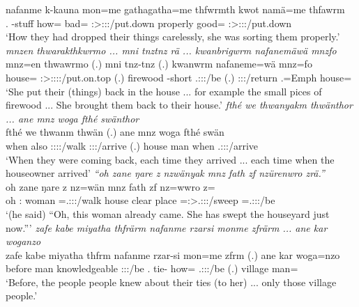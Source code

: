 \begin{exe}
	\gll nafanme k-kauna mon=me gathagatha=me thfwrmth kwot namä=me thfawrm\\
	\Tnsg.{\Poss} \Redup-stuff how={\Ins} bad={\Ins} \Stpl:\Sbj>\Stpl:\Io:\Pst:\Dur/put.down properly good={\Ins} \Stsg:\Sbj>\Stpl:\Obj:\Pst:\Dur/put.down\\
	\trans `How they had dropped their things carelessly, she was sorting them properly.'
	\emph{mnzen thwarakthkwrmo ... mni tnztnz rä ... kwanbrigwrm nafanemäwä mnzfo}\\
	\gll mnz=en thwawrmo (.) mni tnz-tnz  (.) kwanwrm nafaneme=wä mnz=fo\\
	house={\Loc} \Sg:\Sbj>\Stpl:\Io:\Pst:\Dur:\Andat/put.on.top (.) firewood \Redup-short \Tsg.\F:\Sbj:\Nonpast:\Ipfv/be (.) \Stsg:\Sbj:\Pst:\Dur/return \Tnsg.\Poss=Emph{} house=\All\\
	\trans `She put their (things) back in the house ... for example the small pices of firewood ... She brought them back to their house.'
	\emph{fthé we thwanyakm thwänthor ... ane mnz woga fthé swänthor}\\
	\gll fthé we thwanm thwän (.) ane mnz woga fthé swän\\
	when also \Stpl:\Sbj:\Pst:\Dur:\Venit/walk \Stpl:\Sbj:\Iter:\Venit/arrive (.) {\Dem} house man when \Tsg.\Masc:\Sbj:\Iter:\Venit/arrive\\
	\trans `When they were coming back, each time they arrived ... each time when the houseowner arrived'
	\emph{``oh zane ŋare z nzwänyak mnz fath zf nzürenwro zrä.''}\\
	\gll oh zane ŋare z nz=wän mnz fath zf nz=wwro z=\\
	oh \Dem:{\Prox} woman {\Iam} \Immpst=\Tsg.\F:\Nonpast:\Ipfv:\Venit/walk house {clear place} {\Imm} \Immpst=\Sg:\Sbj>\Tsg.\F:\Nonpast:\Ipfv:\Andat/sweep \Prox=\Tsg.\F:\Sbj:\Nonpast:\Ipfv/be\\
	\trans `(he said) ``Oh, this woman already came. She has swept the houseyard just now.'''
	\emph{zafe kabe miyatha thfrärm nafanme rzarsi monme zfrärm ... ane kar woganzo}\\
	\gll zafe kabe miyatha thfrm nafanme rzar-si mon=me zfrm (.) ane kar woga=nzo\\
	before man knowledgeable \Stpl:\Sbj:\Pst:\Dur/be \Tnsg.{\Poss} tie-{\Nmlz} how={\Ins} \Tsg.\F:\Sbj:\Pst:\Dur/be (.) {\Dem} village man={\Only}\\
	\trans `Before, the people people knew about their ties (to her) ... only those village people.'

\end{exe}
